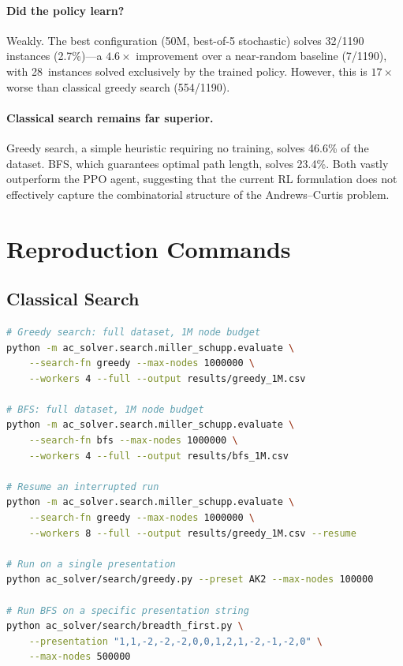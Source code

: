 \documentclass[11pt,a4paper]{article}
\begin{document}
\paragraph{Did the policy learn?}
Weakly.  The best configuration (50M, best-of-5 stochastic) solves 32/1190
instances (2.7\%)---a $4.6\times$ improvement over a near-random baseline
(7/1190), with 28~instances solved exclusively by the trained policy.  However,
this is $17\times$ worse than classical greedy search (554/1190).

\paragraph{Classical search remains far superior.}
Greedy search, a simple heuristic requiring no training, solves 46.6\% of the
dataset.  BFS, which guarantees optimal path length, solves 23.4\%.  Both vastly
outperform the PPO agent, suggesting that the current RL formulation does not
effectively capture the combinatorial structure of the Andrews--Curtis problem.

\appendix
\section{Reproduction Commands}\label{sec:commands}

\subsection{Classical Search}

\begin{lstlisting}[language=bash]
# Greedy search: full dataset, 1M node budget
python -m ac_solver.search.miller_schupp.evaluate \
    --search-fn greedy --max-nodes 1000000 \
    --workers 4 --full --output results/greedy_1M.csv

# BFS: full dataset, 1M node budget
python -m ac_solver.search.miller_schupp.evaluate \
    --search-fn bfs --max-nodes 1000000 \
    --workers 4 --full --output results/bfs_1M.csv

# Resume an interrupted run
python -m ac_solver.search.miller_schupp.evaluate \
    --search-fn greedy --max-nodes 1000000 \
    --workers 8 --full --output results/greedy_1M.csv --resume

# Run on a single presentation
python ac_solver/search/greedy.py --preset AK2 --max-nodes 100000

# Run BFS on a specific presentation string
python ac_solver/search/breadth_first.py \
    --presentation "1,1,-2,-2,-2,0,0,1,2,1,-2,-1,-2,0" \
    --max-nodes 500000
\end{lstlisting}
\end{document}

